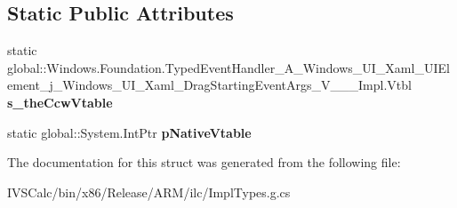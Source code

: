 \subsection*{Static Public Attributes}
\begin{DoxyCompactItemize}
\item 
\mbox{\label{struct_windows_1_1_foundation_1_1_typed_event_handler___a___windows___u_i___xaml___u_i_element__45e7e61598f8bb4613234898c88fca41_a92fcf0e56390f1ae88609923f0d2569c}} 
static global\+::\+Windows.\+Foundation.\+Typed\+Event\+Handler\+\_\+\+A\+\_\+\+Windows\+\_\+\+U\+I\+\_\+\+Xaml\+\_\+\+U\+I\+Element\+\_\+j\+\_\+\+Windows\+\_\+\+U\+I\+\_\+\+Xaml\+\_\+\+Drag\+Starting\+Event\+Args\+\_\+\+V\+\_\+\+\_\+\+\_\+\+Impl.\+Vtbl {\bfseries s\+\_\+the\+Ccw\+Vtable}
\item 
\mbox{\label{struct_windows_1_1_foundation_1_1_typed_event_handler___a___windows___u_i___xaml___u_i_element__45e7e61598f8bb4613234898c88fca41_a0b206081c3e7e6a00617370e14558132}} 
static global\+::\+System.\+Int\+Ptr {\bfseries p\+Native\+Vtable}
\end{DoxyCompactItemize}


The documentation for this struct was generated from the following file\+:\begin{DoxyCompactItemize}
\item 
I\+V\+S\+Calc/bin/x86/\+Release/\+A\+R\+M/ilc/Impl\+Types.\+g.\+cs\end{DoxyCompactItemize}

